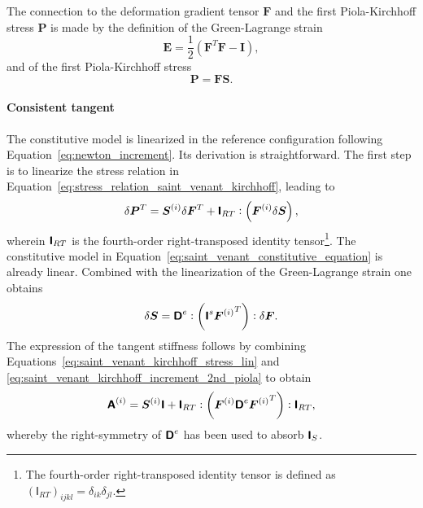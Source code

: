 The connection to the deformation gradient tensor \(\boldsymbol{F}\) and the first Piola-Kirchhoff stress \(\boldsymbol{P}\) is made by the definition of the Green-Lagrange strain
\begin{equation}
\boldsymbol{E}=\frac{1}{2}\left(\boldsymbol{F}^{T}\boldsymbol{F}-\boldsymbol{I}\right),
\end{equation}
and of the first Piola-Kirchhoff stress
\begin{equation} \label{eq:stress_relation_saint_venant_kirchhoff}
\boldsymbol{P}=\boldsymbol{F} \boldsymbol{S}.
\end{equation}

\paragraph{Consistent tangent}
The constitutive model is linearized in the reference configuration following Equation~\eqref{eq:newton_increment}.
Its derivation is straightforward.
The first step is to linearize the stress relation in Equation~\eqref{eq:stress_relation_saint_venant_kirchhoff}, leading to
\begin{equation} \label{eq:saint_venant_kirchhoff_stress_lin}
\delta \boldsymbol{P}^{T}=\boldsymbol{S}^{(i)}\delta \boldsymbol{F}^{T}+\boldsymbol{\mathsf{I}}_{R T}:\left(\boldsymbol{F}^{(i)}\delta \boldsymbol{S}\right),
\end{equation}
wherein \(\boldsymbol{\mathsf{I}}_{R T}\) is the fourth-order right-transposed identity tensor\footnote{The fourth-order right-transposed identity tensor is defined as \((\mathsf I_{RT})_{ijkl} = \delta_{ik}\delta_{jl}\).}.
The constitutive model in Equation~\eqref{eq:saint_venant_constitutive_equation} is already linear.
Combined with the linearization of the Green-Lagrange strain one obtains
\begin{equation} \label{eq:saint_venant_kirchhoff_increment_2nd_piola}
\delta \boldsymbol{S}=\boldsymbol{\mathsf{D}}^e:\left(\boldsymbol{\mathsf{I}}^{s}{\boldsymbol{F}^{(i)}}^{T}\right): \delta \boldsymbol{F}.
\end{equation}
The expression of the tangent stiffness follows by combining Equations~\eqref{eq:saint_venant_kirchhoff_stress_lin} and \eqref{eq:saint_venant_kirchhoff_increment_2nd_piola} to obtain
\begin{equation}
\boldsymbol{\mathsf{A}}^{(i)}=\boldsymbol{S}^{(i)}\boldsymbol{\mathsf{I}}+\boldsymbol{\mathsf{I}}_{R T}:\left(\boldsymbol{F}^{(i)}  \boldsymbol{\mathsf{D}}^e  {\boldsymbol{F}^{(i)}}^{T}\right): \boldsymbol{\mathsf{I}}_{R T},
\end{equation}
whereby the right-symmetry of \(\boldsymbol{\mathsf{D}}^e\) has been used to absorb \(\boldsymbol{\mathsf{I}}_{S}\).

